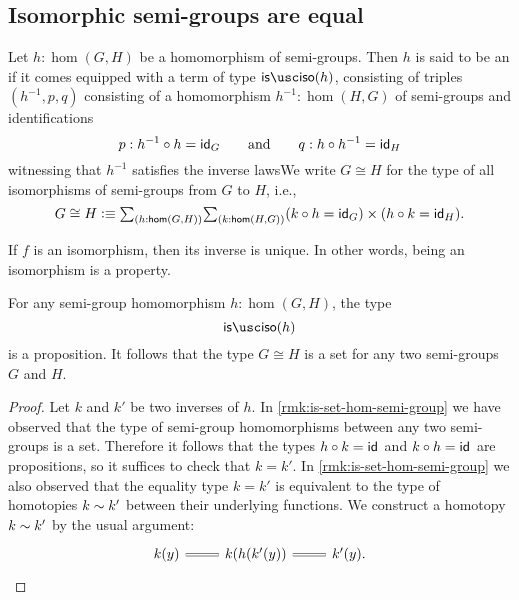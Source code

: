 \subsection{Isomorphic semi-groups are equal}

\begin{defn}
Let $h:\hom(G,H)$ be a homomorphism of semi-groups. Then $h$ is said to be an  if it comes equipped with a term of type $\isiso(h)$, consisting of triples $(h^{-1},p,q)$ consisting of a homomorphism $h^{-1}:\hom(H,G)$ of semi-groups and identifications
\begin{equation*}
p:h^{-1}\circ h=\idfunc[G]\qquad\text{and}\qquad q:h\circ h^{-1}=\idfunc[H]
\end{equation*}
witnessing that $h^{-1}$ satisfies the inverse lawsWe write $G\cong H$ for the type of all isomorphisms of semi-groups from $G$ to $H$, i.e.,
\begin{equation*}
G\cong H \defeq \sm{h:\hom(G,H)}{k:\hom(H,G)} (k\circ h = \idfunc[G])\times (h\circ k=\idfunc[H]).
\end{equation*}
\end{defn}

If $f$ is an isomorphism, then its inverse is unique. In other words, being an isomorphism is a property.

\begin{lem}
  For any semi-group homomorphism $h:\hom(G,H)$, the type
  \begin{equation*}
    \isiso(h)
  \end{equation*}
  is a proposition. It follows that the type $G\cong H$ is a set for any two semi-groups $G$ and $H$.
\end{lem}

\begin{proof}
  Let $k$ and $k'$ be two inverses of $h$. In \cref{rmk:is-set-hom-semi-group} we have observed that the type of semi-group homomorphisms between any two semi-groups is a set. Therefore it follows that the types $h\circ k=\idfunc$ and $k\circ h=\idfunc$ are propositions, so it suffices to check that $k=k'$. In \cref{rmk:is-set-hom-semi-group} we also observed that the equality type $k=k'$ is equivalent to the type of homotopies $k\htpy k'$ between their underlying functions. We construct a homotopy $k\htpy k'$ by the usual argument:
  \begin{equation*}
    \begin{tikzcd}
      k(y) \arrow[r,equals] & k(h(k'(y)) \arrow[r,equals] & k'(y).
    \end{tikzcd}\qedhere
  \end{equation*}
\end{proof}

